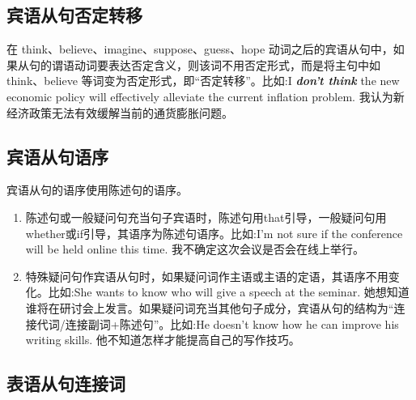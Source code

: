 \subsection{宾语从句否定转移}

在 think、believe、imagine、suppose、guess、hope 动词之后的宾语从句中，如果从句的谓语动词要表达否定含义，则该词不用否定形式，而是将主句中如 think、believe 等词变为否定形式，即“否定转移”。比如:I \textbf{\textit{don't think}} the new economic policy will effectively alleviate the current inflation problem. 我认为新经济政策无法有效缓解当前的通货膨胀问题。

\subsection{宾语从句语序}

宾语从句的语序使用陈述句的语序。
\begin{enumerate}
  \item 陈述句或一般疑问句充当句子宾语时，陈述句用that引导，一般疑问句用whether或if引导，其语序为陈述句语序。比如:I'm not sure if the conference will be held online this time. 我不确定这次会议是否会在线上举行。
  \item 特殊疑问句作宾语从句时，如果疑问词作主语或主语的定语，其语序不用变化。比如:She wants to know who will give a speech at the seminar. 她想知道谁将在研讨会上发言。如果疑问词充当其他句子成分，宾语从句的结构为“连接代词/连接副词+陈述句”。比如:He doesn’t know how he can improve his writing skills. 他不知道怎样才能提高自己的写作技巧。
\end{enumerate}

\subsection{表语从句连接词}

